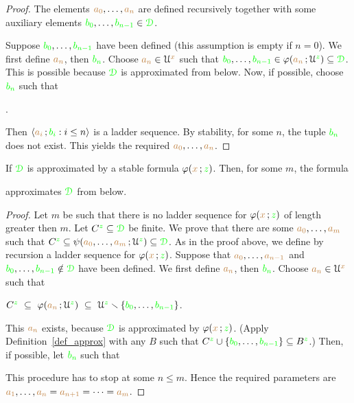 \begin{proof}
The elements ${\color{brown} a_0},\dots,{\color{brown} a_n}$ are defined recursively together with some auxiliary elements ${\color{green} b_0},\dots,{\color{green} b_{n-1}}\in{\color{green}\EuScript D}$.

Suppose ${\color{green} b_0},\dots,{\color{green} b_{n-1}}$ have been defined (this assumption is empty if $n=0$).
We first define ${\color{brown} a_n}$, then ${\color{green} b_n}$.
Choose ${\color{brown} a_n}\in\EuScript U^{\color{brown} x}$ such that ${\color{green} b_0},\dots,{\color{green} b_{n-1}}\in\varphi({\color{brown} a_n}\,;\EuScript U^{\color{green} z})\subseteq{\color{green}\EuScript D}$.
This is possible because ${\color{green}\EuScript D}$ is approximated from below.
Now, if possible, choose ${\color{green} b_n}$ such that

.

Then $\langle{\color{brown}a_i}\,;{\color{green} b_i} : i\le n\rangle$ is a ladder sequence.
By stability, for some $n$, the tuple ${\color{green} b_n}$ does not exist.
This yields the required ${\color{brown} a_0},\dots,{\color{brown} a_n}$.
\end{proof}

\begin{lemma}\label{lem_stab_approx_below}
If ${\color{green}\EuScript D}$ is approximated by a stable formula $\varphi({\color{brown} x}\,;{\color{green} z})$.
Then, for some $m$, the formula


approximates ${\color{green}\EuScript D}$ from below.
\end{lemma}

\begin{proof}
Let $m$ be such that there is no ladder sequence for $\varphi({\color{brown} x}\,;{\color{green} z})$ of length greater then $m$.
Let $C^{\color{green} z}\subseteq{\color{green}\EuScript D}$ be finite.
We prove that there are some ${\color{brown} a_0},\dots,{\color{brown} a_m}$ such that $C^{\color{green} z}\subseteq\psi({\color{brown} a_0},\dots,{\color{brown} a_m}\,;\EuScript U^{\color{green} z})\subseteq{\color{green}\EuScript D}$.
As in the proof above, we define by recursion a ladder sequence for $\varphi({\color{brown} x}\,;{\color{green} z})$.
Suppose that ${\color{brown} a_0},\dots,{\color{brown} a_{n-1}}$ and ${\color{green} b_0},\dots,{\color{green} b_{n-1}}\notin{\color{green}\EuScript D}$ have been defined.
We first define ${\color{brown} a_n}$, then ${\color{green} b_n}$. 
Choose ${\color{brown} a_n}\in\EuScript U^{\color{brown} x}$ such that 

\hfil$C^{\color{green} z}\ \subseteq\ \varphi({\color{brown} a_n}\,;\EuScript U^{\color{green} z})\ \subseteq\ \EuScript U^{\color{green} z}\smallsetminus\{{\color{green} b_0},\dots,{\color{green} b_{n-1}}\}$.

This ${\color{brown} a_n}$ exists, because ${\color{green}\EuScript D}$ is approximated by $\varphi({\color{brown} x}\,;{\color{green} z})$.
(Apply Definition~\ref{def_approx} with any $B$ such that $C^{\color{green} z}\cup\{{\color{green} b_0},\dots,{\color{green} b_{n-1}}\}\subseteq B^{\color{green} z}$.)
Then, if possible, let ${\color{green} b_n}$ such that


This procedure has to stop at some $n\le m$.
Hence the required parameters are ${\color{brown} a_1},\dots,{\color{brown} a_n}={\color{brown} a_{n+1}}=\dots={\color{brown} a_{m}}$.
\end{proof}

